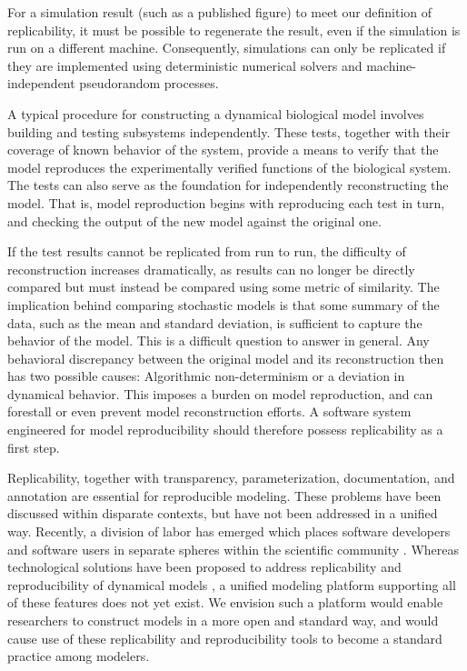 \documentclass[journal,transmag,twoside]{IEEEtran}
\begin{document}
For a simulation result (such as a published figure) to meet our definition of replicability,
it must be possible to regenerate the result,
even if the simulation is run on a different machine.
Consequently, simulations can only be replicated if they are implemented using deterministic numerical solvers and
machine-independent pseudorandom processes.

A typical procedure for constructing a dynamical biological model
involves building and testing subsystems independently.
These tests, together with their coverage of known behavior of the system, provide a means to verify
that the model reproduces the experimentally verified functions of the biological system.
The tests can also serve as the foundation for independently reconstructing the model.
That is, model reproduction begins with reproducing each test in turn, and checking
the output of the new model against the original one.

If the test results cannot be replicated from run to run, the difficulty of reconstruction
increases dramatically, as results can no longer be directly compared but must instead
be compared using some metric of similarity.
The implication behind comparing stochastic models is that some summary of the data,
such as the mean and standard deviation, is sufficient to capture the behavior of the
model.
This is a difficult question to answer in general.
Any behavioral discrepancy between the original model and its reconstruction
then has two possible causes: Algorithmic non-determinism or a deviation in dynamical
behavior.
This imposes a burden on model reproduction, and can forestall or even prevent
model reconstruction efforts.
A software system engineered for model reproducibility should therefore possess
replicability as a first step.

Replicability, together with transparency, parameterization, documentation,
and annotation are essential for reproducible modeling.
These problems have been discussed within disparate contexts, but
have not been addressed in a unified way.
Recently, a division of labor has emerged which places software developers and
software users in separate spheres within the scientific community \cite{mesirov2010computer}.
Whereas technological solutions have been proposed to address replicability and reproducibility
of dynamical models \cite{bergmann2014combine} \cite{waltemath2011minimum} \cite{novere2005minimum},
a unified modeling platform supporting all of these features does not yet exist.
We envision such a platform would enable researchers to construct models in a
more open and standard way, and would cause use of these replicability and reproducibility
tools to become a standard practice among modelers.
\end{document}
